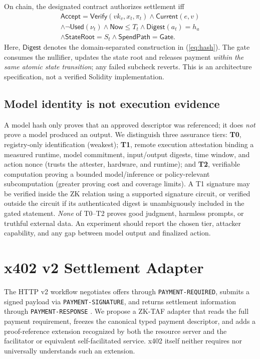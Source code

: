 \documentclass[conference]{IEEEtran}
\newcommand{\zktaf}{\textsc{ZK-TAF}}
\newcommand{\Verify}{\mathsf{Verify}}
\newcommand{\Accept}{\mathsf{Accept}}
\begin{document}
On chain, the designated contract authorizes settlement iff
\begin{multline}
\Accept=\Verify(vk_v,x_t,\pi_t)\wedge\mathsf{Current}(e,v)\\
\wedge\neg\mathsf{Used}(\nu_t)\wedge\mathsf{Now}\leq T_t
\wedge\mathsf{Digest}(a_t)=h_a\\
\wedge\mathsf{StateRoot}=S_t\wedge\mathsf{SpendPath}=\textsf{Gate}.
\label{eq:gate}
\end{multline}
Here, \(\mathsf{Digest}\) denotes the domain-separated construction in (\ref{eq:hash}). The gate consumes the nullifier, updates the state root and releases payment \emph{within the same atomic state transition}; any failed subcheck reverts. This is an architecture specification, not a verified Solidity implementation.

\subsection{Model identity is not execution evidence}
A model hash only proves that an approved descriptor was referenced; it does \emph{not} prove a model produced an output. We distinguish three assurance tiers: \textbf{T0}, registry-only identification (weakest); \textbf{T1}, remote execution attestation binding a measured runtime, model commitment, input/output digests, time window, and action nonce (trusts the attester, hardware, and runtime); and \textbf{T2}, verifiable computation proving a bounded model/inference or policy-relevant subcomputation (greater proving cost and coverage limits). A T1 signature may be verified inside the ZK relation using a supported signature circuit, or verified outside the circuit if its authenticated digest is unambiguously included in the gated statement. \emph{None} of T0--T2 proves good judgment, harmless prompts, or truthful external data. An experiment should report the chosen tier, attacker capability, and any gap between model output and finalized action.

\section{x402 v2 Settlement Adapter}
The HTTP v2 workflow negotiates offers through \texttt{PAYMENT-REQUIRED}, submits a signed payload via \texttt{PAYMENT-SIGNATURE}, and returns settlement information through \texttt{PAYMENT-RESPONSE} \cite{x402spec}. We propose a \zktaf{} adapter that reads the full payment requirement, freezes the canonical typed payment descriptor, and adds a proof-reference extension recognized by both the resource server and the facilitator or equivalent self-facilitated service. x402 itself neither requires nor universally understands such an extension.
\end{document}
